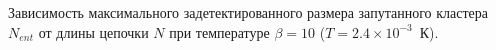 Зависимость максимального задетектированного размера запутанного кластера~$N_{ent}$ от длины цепочки $N$ при температуре $\beta = 10$ ($T = 2.4\times 10^{-3}$~К).
